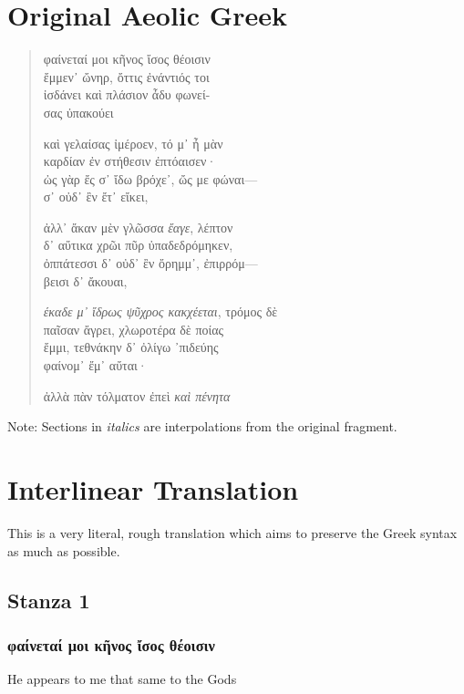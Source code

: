 \section*{Original Aeolic Greek}
\begin{verse}
  φαίνεταί μοι κῆνος ἴσος θέοισιν \\
  ἔμμεν᾽ ὤνηρ, ὄττις ἐνάντιός τοι \\
  ἰσδάνει καὶ πλάσιον ἆδυ φωνεί-  \\
  σας ὐπακούει \\
  \smallskip

  καὶ γελαίσας ἰμέροεν, τό μ᾽ ἦ μὰν \\
  καρδίαν ἐν στήθεσιν ἐπτόαισεν· \\
  ὠς γὰρ ἔς σ᾽ ἴδω βρόχε᾽, ὤς με φώναι--- \\
  σ᾽ οὐδ᾽ ἒν ἔτ᾽ εἴκει, \\
  \smallskip

  ἀλλ᾽ ἄκαν μὲν γλῶσσα \emph{ἔαγε}, λέπτον \\
  δ᾽ αὔτικα χρῶι πῦρ ὐπαδεδρόμηκεν, \\
  ὀππάτεσσι δ᾽ οὐδ᾽ ἒν ὄρημμ᾽, ἐπιρρόμ--- \\
  βεισι δ᾽ ἄκουαι, \\
  \smallskip

  \emph{έκαδε μ᾽ ἴδρως ψῦχρος κακχέεται}, τρόμος δὲ \\
  παῖσαν ἄγρει, χλωροτέρα δὲ ποίας \\
  ἔμμι, τεθνάκην δ᾽ ὀλίγω ᾽πιδεύης \\
  φαίνομ᾽ ἔμ᾽ αὔται· \\
  \smallskip

  ἀλλὰ πὰν τόλματον ἐπεὶ \emph{καὶ πένητα}
\end{verse}

\noindent
Note: Sections in \emph{italics} are interpolations from the original fragment.

\section*{Interlinear Translation}
This is a very literal, rough translation which aims to preserve the Greek syntax as much as possible.

\subsection*{Stanza 1}
\subsubsection*{φαίνεταί μοι κῆνος ἴσος θέοισιν}
He appears to me that same to the Gods

